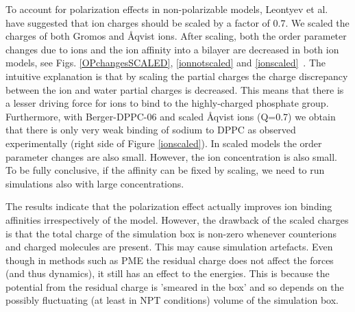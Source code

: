 \documentclass[pre,aps,floatfix,authordate1-4,twocolumn]{revtex4-1}
\begin{document}
To account for polarization effects in non-polarizable models, Leontyev et al.~\cite{leontyev11} have suggested
that ion charges should be scaled by a factor of 0.7. We scaled the charges of both Gromos and \r{A}qvist ions. 
After scaling, both the order parameter changes due to ions and the ion affinity into a bilayer are decreased in both ion models, see
Figs. \ref{OPchangesSCALED}, \ref{ionnotscaled} and \ref{ionscaled}~\cite{DPPCBergerNaClscaled, DPPCBergerOPLS06NaClscaled}. The intuitive explanation is that by
scaling the partial charges the charge discrepancy between the ion and water partial charges is decreased. This means
that there is a lesser driving force for ions to bind to the highly-charged phosphate group. Furthermore, with
Berger-DPPC-06 and scaled \r{A}qvist ions (Q=0.7) we obtain that there is only very weak binding of sodium to DPPC as
observed experimentally (right side of Figure \ref{ionscaled}). In scaled models the order parameter changes 
are also small. However, the ion concentration is also small. To be fully conclusive, if the affinity can be fixed by scaling,
we need to run simulations also with large concentrations.


The results indicate that the polarization effect actually improves ion binding affinities irrespectively of the model.
However, the drawback of the scaled charges is that the total charge of the simulation box is non-zero whenever
counterions and charged molecules are present. This may cause simulation artefacts. Even though in methods such as
PME the residual charge does not affect the forces (and thus dynamics), it still has an effect to the energies.
This is because the potential from the residual charge is 'smeared in the box' and so depends on the possibly
fluctuating (at least in NPT conditions) volume of the simulation box. 
\end{document}
